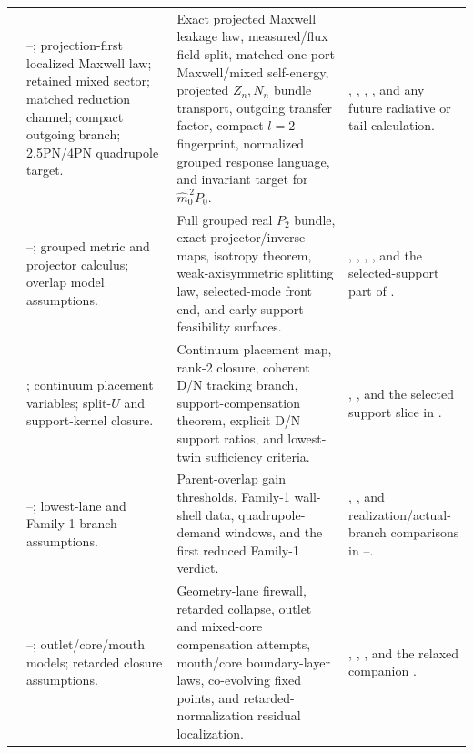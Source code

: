 \begin{longtable}{L{0.11\textwidth}L{0.22\textwidth}L{0.25\textwidth}L{0.28\textwidth}}
\addlinespace
{} & --; projection-first localized Maxwell law; retained mixed sector; matched reduction channel; compact outgoing branch; 2.5PN/4PN quadrupole target. & Exact projected Maxwell leakage law, measured/flux field split, matched one-port Maxwell/mixed self-energy, projected \(Z_n,N_n\) bundle transport, outgoing transfer factor, compact \(l=2\) fingerprint, normalized grouped response language, and invariant target for \(\widehat m_0^{\,2}P_0\). & , , , , and any future radiative or tail calculation. \\
\addlinespace
{} & --; grouped metric and projector calculus; overlap model assumptions. & Full grouped real \(P_2\) bundle, exact projector/inverse maps, isotropy theorem, weak-axisymmetric splitting law, selected-mode front end, and early support-feasibility surfaces. & , , , , and the selected-support part of . \\
\addlinespace
{} & ; continuum placement variables; split-\(U\) and support-kernel closure. & Continuum placement map, rank-2 closure, coherent D/N tracking branch, support-compensation theorem, explicit D/N support ratios, and lowest-twin sufficiency criteria. & , , and the selected support slice in . \\
\addlinespace
{} & --; lowest-lane and Family-1 branch assumptions. & Parent-overlap gain thresholds, Family-1 wall-shell data, quadrupole-demand windows, and the first reduced Family-1 verdict. & , , and realization/actual-branch comparisons in --. \\
\addlinespace
{} & --; outlet/core/mouth models; retarded closure assumptions. & Geometry-lane firewall, retarded collapse, outlet and mixed-core compensation attempts, mouth/core boundary-layer laws, co-evolving fixed points, and retarded-normalization residual localization. & , , , and the relaxed companion . \\

\end{longtable}
